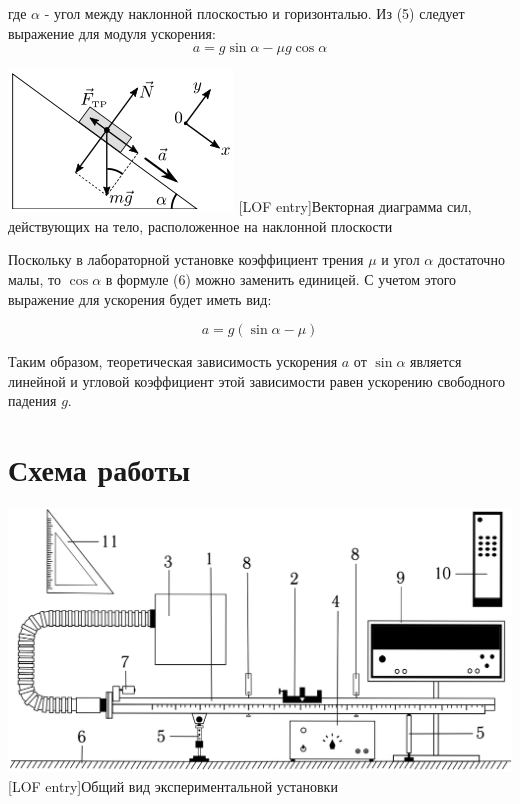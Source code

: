 \documentclass[a4paper]{article}
\begin{document}
где $\alpha$ - угол между наклонной плоскостью и горизонталью. Из
(5) следует выражение для модуля ускорения:
\begin{equation}
a=g\sin\alpha-\mu g\cos\alpha
\end{equation}
\begin{center}
  \includegraphics[scale=0.75]{pik.png}
  [LOF entry]{Векторная диаграмма сил, действующих на тело, расположенное на наклонной плоскости}   
  \label{fig:picture}
\end{center}

Поскольку в лабораторной установке коэффициент трения $\mu$ и угол $\alpha$ достаточно малы, то $\cos\alpha$ в формуле (6) можно заменить единицей. С учетом этого выражение для ускорения будет иметь вид:


\begin{equation}
a=g(\sin\alpha-\mu)
\end{equation}

Таким образом, теоретическая зависимость ускорения $a$ от $\sin\alpha$ является линейной и угловой коэффициент этой зависимости равен ускорению свободного падения $g$.




\section{Схема работы}
\begin{center}
  \includegraphics[scale=0.3]{pic2.png}
  [LOF entry]{Общий вид экспериментальной установки}
  \label{fig:picture}
\end{center}
\end{document}

